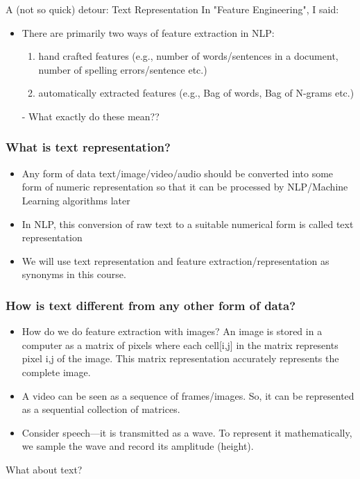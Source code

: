\documentclass{beamer}
\begin{document}
\begin{frame}{A (not so quick) detour: Text Representation}
    In "Feature Engineering", I said:
    \begin{itemize}
    \item There are primarily two ways of feature extraction in NLP:
    \begin{enumerate}
        \item  hand crafted features (e.g., number of words/sentences in a document, number of spelling errors/sentence etc.)
        \item automatically extracted features (e.g., Bag of words, Bag of N-grams etc.)
    \end{enumerate}
    - What exactly do these mean??
\end{itemize}
\end{frame}

\begin{frame}
\frametitle{What is text representation?}
\begin{itemize}
\item Any form of data text/image/video/audio should be converted into some form of numeric representation so that it can be processed by NLP/Machine Learning algorithms later
\item In NLP, this conversion of raw text to a suitable numerical form is called text representation
\item We will use text representation and feature extraction/representation as synonyms in this course.
\end{itemize}
\end{frame}

\begin{frame}
\frametitle{How is text different from any other form of data?}
\begin{itemize}
\item How do we do feature extraction with images? An image is stored in a computer as a matrix of pixels where each cell[i,j] in the matrix represents pixel i,j of the image. This matrix representation accurately represents the complete image. \pause
\item A video can be seen as a sequence of frames/images. So, it can be represented as a sequential collection of matrices. \pause
\item Consider speech—it is transmitted as a wave. To represent it mathematically, we sample the wave and record its amplitude (height).
\end{itemize}
What about text?
\end{frame}
\end{document}
